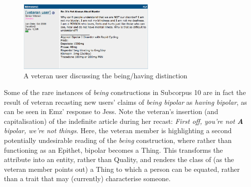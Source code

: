 \begin{figure}[htb]
  \centering
  \includegraphics[width=0.60\textwidth]{../images/notourbipolar.png}
  \caption{A veteran user discussing the being\slash having distinction}
  \label{fig:notour}
  \end{figure}
%    
Some of the rare instances of \emph{being} constructions in Subcorpus 10 are in fact the result of veteran  recasting new users' claims of \emph{being bipolar} as \emph{having bipolar}, as can be seen in Emz' response to Jess. Note the veteran's insertion (and capitalisation) of the indefinite article during her recast: \emph{First off, you're not \textbf{A} bipolar, we're not things}. Here, the veteran \gls{member} is highlighting a second potentially undesirable reading of the \emph{being} construction, where rather than functioning as an Epithet, \gls{bipolar} becomes a Thing. This transforms the attribute into an entity, rather than Quality, and renders the class of  (as the veteran \gls{member} points out) a Thing to which a person can be equated, rather than a trait that may (currently) characterise someone.




